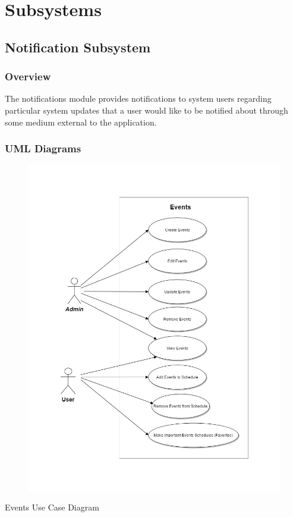 \documentclass{article}
\begin{document}
    \section{Subsystems}
    
    \subsection{Notification Subsystem}
    
    \subsubsection{Overview}
    
    The notifications module provides notifications to system users regarding
    particular system updates that a user would like to be notified about through
    some medium external to the application.
    
    \subsubsection{UML Diagrams}
    
    \begin{figure}[h!]
        \includegraphics[width=\textwidth]{Images/EventUC.jpg}
    \end{figure}
    Events Use Case Diagram
    
\end{document}
